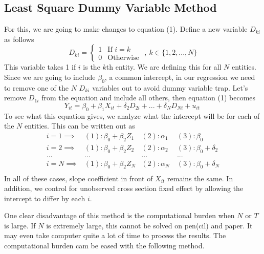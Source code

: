 \subsection{Least Square Dummy Variable Method}
For this, we are going to make changes to equation (1). Define a new variable $D_{ki}$ as follows
\[
D_{ki} = \begin{cases} 1 & \text{If $i=k$} \\
                                     0 & \text{Otherwise } \end{cases} , \ k\in\{1,2,...,N\}
\] 
This variable takes 1 if $i$ is the $k$th entity. We are defining this for all $N$ entities. Since we are going to include $\beta_0$, a common intercept, in our regression we need to remove one of the $N$ $D_{ki}$ variables out to avoid dummy variable trap. Let's remove $D_{1i}$ from the equation and include all others, then equation (1) becomes
\[
Y_{it} = \beta_0 +\beta_1X_{it}+\delta_2D_{2i} + ... + \delta_ND_{Ni}+u_{it} \ \tag{LSDV}
\]
To see what this equation gives, we analyze what the intercept will be for each of the $N$ entities. This can be written out as
\[
\begin{aligned}
i=1 \implies & (1): \beta_0 + \beta_2Z_1 &(2): \alpha_1 \ & (3): \beta_0\\ 
i=2 \implies & (1): \beta_0 + \beta_2Z_2 &(2): \alpha_2 \ & (3): \beta_0+\delta_2\\ 
...&...&...&...\\
i=N \implies & (1): \beta_0 + \beta_2Z_N &(2): \alpha_N \ & (3): \beta_0+\delta_N\\ 
\end{aligned}
\]
In all of these cases, slope coefficient in front of $X_{it}$ remains the same. In addition, we control for unobserved cross section fixed effect by allowing the intercept to differ by each $i$. \par\medskip
One clear disadvantage of this method is the computational burden when $N$ or $T$ is large. If $N$ is extremely large, this cannot be solved on pen(cil) and paper. It may even take computer quite a lot of time to process the results. The computational burden cam be eased with the following method. \par\medskip
